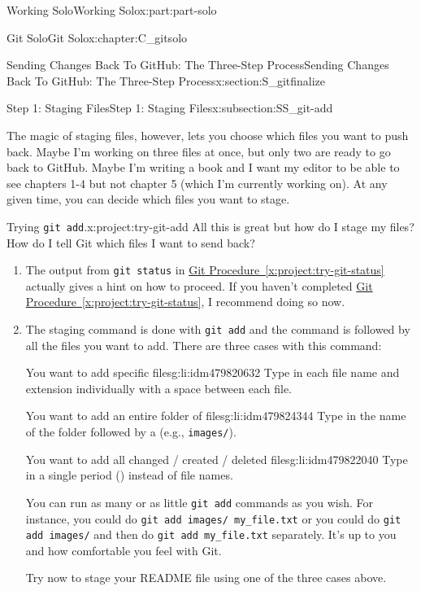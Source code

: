 \documentclass[oneside,10pt,]{book}
\newcommand{\xreffont}{\relax}
\newcommand{\mono}[1]{\texttt{#1}}
\newcommand{\kbd}[1]{\keys{{#1}}}
\begin{document}
\begin{partptx}{Working Solo}{}{Working Solo}{}{}{x:part:part-solo}
\begin{chapterptx}{Git Solo}{}{Git Solo}{}{}{x:chapter:C_gitsolo}
\begin{sectionptx}{Sending Changes Back To GitHub: The Three-Step Process}{}{Sending Changes Back To GitHub: The Three-Step Process}{}{}{x:section:S_gitfinalize}
\begin{subsectionptx}{Step 1: Staging Files}{}{Step 1: Staging Files}{}{}{x:subsection:SS_git-add}
\par
The magic of staging files, however, lets you choose which files you want to push back. Maybe I'm working on three files at once, but only two are ready to go back to GitHub. Maybe I'm writing a book and I want my editor to be able to see chapters 1-4 but not chapter 5 (which I'm currently working on). At any given time, you can decide which files you want to stage.%
\begin{project}{Trying \mono{git add}.}{x:project:try-git-add}%
All this is great but how do I stage my files? How do I tell Git which files I want to send back?%
\begin{enumerate}[font=\bfseries,label=(\alph*),ref=\alph*]
\item{}The output from \mono{git status} in \hyperref[x:project:try-git-status]{Git Procedure~{\xreffont\ref{x:project:try-git-status}}} actually gives a hint on how to proceed. If you haven't completed \hyperref[x:project:try-git-status]{Git Procedure~{\xreffont\ref{x:project:try-git-status}}}, I recommend doing so now.%
\item{}The staging command is done with \mono{git add} and the command is followed by all the files you want to add. There are three cases with this command:%
\begin{descriptionlist}
\begin{dlimedium}{You want to add specific files}{g:li:idm479820632}%
Type in each file name and extension individually with a space between each file.%
\end{dlimedium}%
\begin{dlimedium}{You want to add an entire folder of files}{g:li:idm479824344}%
Type in the name of the folder followed by a \kbd{/} (e.g.\@, \mono{images/}).%
\end{dlimedium}%
\begin{dlimedium}{You want to add all changed \slash{} created \slash{} deleted files}{g:li:idm479822040}%
Type in a single period (\kbd{.}) instead of file names.%
\end{dlimedium}%
\end{descriptionlist}
%
\par
You can run as many or as little \mono{git add} commands as you wish. For instance, you could do \mono{git add images/ my\_file.txt} or you could do \mono{git add images/} and then do \mono{git add my\_file.txt} separately. It's up to you and how comfortable you feel with Git.%
\par
Try now to stage your README file using one of the three cases above.%

\end{enumerate}
\end{project}
\end{subsectionptx}
\end{sectionptx}
\end{chapterptx}
\end{partptx}
\end{document}

